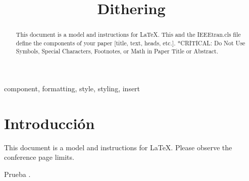 \documentclass[conference]{IEEEtran}
\begin{document}
\title{Dithering\\
}


\author{
\and
{}

}

\maketitle


\begin{abstract}
This document is a model and instructions for \LaTeX.
This and the IEEEtran.cls file define the components of your paper [title, text, heads, etc.]. *CRITICAL: Do Not Use Symbols, Special Characters, Footnotes, 
or Math in Paper Title or Abstract.
\end{abstract}

\begin{IEEEkeywords}
component, formatting, style, styling, insert
\end{IEEEkeywords}

\section{Introducción}
This document is a model and instructions for \LaTeX.
Please observe the conference page limits.

Prueba \cite{b1}.


\end{document}

